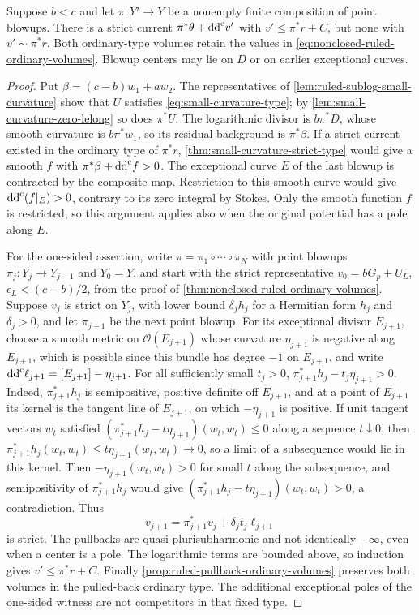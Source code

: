 \begin{proposition}\label{prop:ruled-blowup-strict-type-obstruction}
Suppose $b<c$ and let $\pi\colon Y'\to Y$ be a nonempty finite composition
of point blowups. There is a strict current $\pi^*\theta+\mathrm{dd}^{\mathrm{c}} v'$
with $v'\leq\pi^*r+C$, but none with $v'\sim\pi^*r$.
Both ordinary-type volumes retain the values in
\eqref{eq:nonclosed-ruled-ordinary-volumes}. Blowup centers may lie on
$D$ or on earlier exceptional curves.
\end{proposition}
\begin{proof}
Put $\beta=(c-b)w_1+aw_2$. The representatives of
\cref{lem:ruled-sublog-small-curvature} show that $U$ satisfies
\eqref{eq:small-curvature-type}; by
\cref{lem:small-curvature-zero-lelong} so does $\pi^*U$.
The logarithmic divisor is $b\pi^*D$, whose smooth curvature is
$b\pi^*w_1$, so its residual background is $\pi^*\beta$.
If a strict current existed in the ordinary type of $\pi^*r$,
\cref{thm:small-curvature-strict-type} would give a smooth $f$ with
$\pi^*\beta+\mathrm{dd}^{\mathrm{c}} f>0$. The exceptional curve $E$ of the last blowup
is contracted by the composite map. Restriction to this smooth curve
would give $\mathrm{dd}^{\mathrm{c}}(f|_E)>0$, contrary to its zero integral by Stokes.
Only the smooth function $f$ is restricted, so this argument applies
also when the original potential has a pole along $E$.

For the one-sided assertion, write $\pi=\pi_1\circ\cdots\circ\pi_N$
with point blowups $\pi_j\colon Y_j\to Y_{j-1}$ and $Y_0=Y$, and start
with the strict representative $v_0=bG_p+U_L$, $\epsilon_L<(c-b)/2$, from
the proof of \cref{thm:nonclosed-ruled-ordinary-volumes}.
Suppose $v_j$ is strict on $Y_j$, with lower bound $\delta_jh_j$ for a
Hermitian form $h_j$ and $\delta_j>0$, and let $\pi_{j+1}$ be the next
point blowup. For its exceptional divisor $E_{j+1}$, choose a smooth
metric on $\mathcal O(E_{j+1})$ whose curvature $\eta_{j+1}$ is negative
along $E_{j+1}$, which is possible since this bundle has degree $-1$ on
$E_{j+1}$, and write $\mathrm{dd}^{\mathrm{c}}\ell_{j+1}=[E_{j+1}]-\eta_{j+1}$.
For all sufficiently small $t_j>0$,
$\pi_{j+1}^*h_j-t_j\eta_{j+1}>0$.
Indeed, $\pi_{j+1}^*h_j$ is semipositive, positive definite off
$E_{j+1}$, and at a point of $E_{j+1}$ its kernel is the tangent line of
$E_{j+1}$, on which $-\eta_{j+1}$ is positive. If unit tangent vectors
$w_t$ satisfied $(\pi_{j+1}^*h_j-t\eta_{j+1})(w_t,w_t)\leq0$ along a
sequence $t\downarrow0$, then
$\pi_{j+1}^*h_j(w_t,w_t)\leq t\eta_{j+1}(w_t,w_t)\to0$, so a limit of a
subsequence would lie in this kernel. Then $-\eta_{j+1}(w_t,w_t)>0$ for
small $t$ along the subsequence, and semipositivity of
$\pi_{j+1}^*h_j$ would give $(\pi_{j+1}^*h_j-t\eta_{j+1})(w_t,w_t)>0$,
a contradiction.
Thus
\[
 v_{j+1}=\pi_{j+1}^*v_j+\delta_jt_j\ell_{j+1}
\]
is strict. The pullbacks are quasi-plurisubharmonic and not identically
$-\infty$, even when a center is a pole. The logarithmic terms are bounded above,
so induction gives $v'\leq\pi^*r+C$.
Finally \cref{prop:ruled-pullback-ordinary-volumes} preserves both
volumes in the pulled-back ordinary type. The additional exceptional
poles of the one-sided witness are not competitors in that fixed type.
\end{proof}


